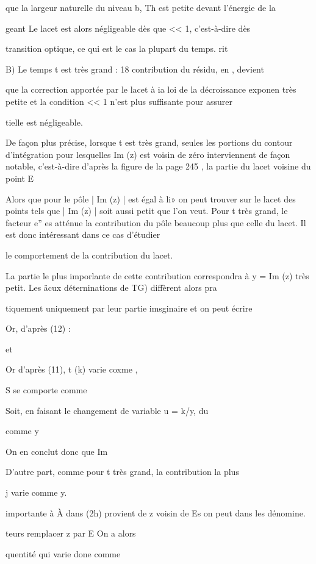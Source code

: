 que la largeur naturelle du niveau b, Th est petite devant l'énergie de la

geant Le lacet est alors négligeable dès que << 1, c'est-à-dire dès

transition optique, ce qui est le cas la plupart du temps. rit

B) Le temps t est très grand : 18 contribution du résidu, en , devient

que la correction apportée par le lacet à ia loi de la décroissance exponen
très petite et la condition << 1 n'est plus suffisante pour assurer

tielle est négligeable.

De façon plus précise, lorsque t est très grand, seules les portions du contour d'intégration pour lesquelles Im (z) est voisin de zéro interviennent de façon notable, c'est-à-dire d'après la figure de la page 245 ,
la partie du lacet voisine du point E

Alors que pour le pôle  | Im (z) | est égal à li» on peut
trouver sur le lacet des points tels que | Im (z) | soit aussi petit que l'on
veut. Pour t très grand, le facteur e” es atténue la contribution du pôle
beaucoup plus que celle du lacet. Il est donc intéressant dans ce cas d'étudier

le comportement de la contribution du lacet.

La partie le plus imporlante de cette contribution correspondra
à y = Im (z) très petit. Les äcux déterninations de TG) diffèrent alors pra

tiquement uniquement par leur partie imsginaire et on peut écrire

Or, d'après (12) :

et

Or d'après (11), t (k) varie coxme ,

S se comporte comme



Soit, en faisant le changement de variable u = k/y,
du

comme y

On en conclut donc que Im

D'autre part, comme pour t très grand, la contribution la plus

 j varie comme y.

importante à À dans (2h) provient de z voisin de Es on peut dans les dénomine.

teurs remplacer z par E On a alors

quentité qui varie done comme

